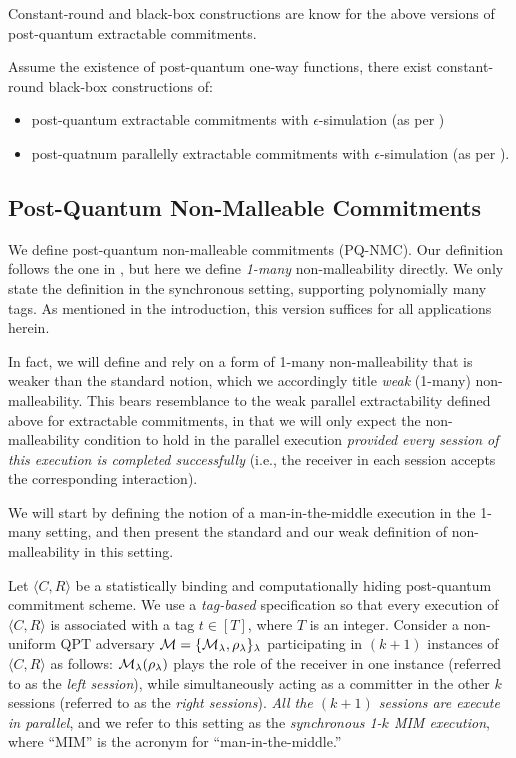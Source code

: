 Constant-round and black-box constructions are know for the above versions of post-quantum extractable commitments.
\begin{lemma}
\label{lem:parallel-extcom:CCLY}
Assume the existence of post-quantum one-way functions, there exist constant-round black-box constructions of:
\begin{itemize}
\item
post-quantum extractable commitments with $\epsilon$-simulation (as per )
\item
post-quatnum parallelly extractable commitments with $\epsilon$-simulation (as per ).
\end{itemize}
\end{lemma}


\subsection{Post-Quantum Non-Malleable Commitments}\label{sec:nmcom}



We define post-quantum non-malleable commitments (PQ-NMC). Our definition follows the one in \cite{FOCS:LPY23}, but here we define {\em 1-many} non-malleability directly. We only state the definition in the synchronous setting, supporting polynomially many tags. As mentioned in the introduction, this version suffices for all applications herein. 

In fact, we will define and rely on a form of 1-many non-malleability that is weaker than the standard notion, which we accordingly title {\em weak} (1-many) non-malleability.  This bears resemblance to the weak parallel extractability defined above for extractable commitments, in that we will only expect the non-malleability condition to hold in the parallel execution {\em provided every session of this execution is completed successfully} (i.e., the receiver in each session accepts the corresponding interaction).

We will start by defining the notion of a man-in-the-middle execution in the 1-many setting, and then present the standard and our weak definition of non-malleability in this setting. 


 Let $\langle C, R\rangle$ be a statistically binding and computationally hiding post-quantum commitment scheme. We use a {\em tag-based} specification so that every execution of $\langle C, R\rangle$ is associated with a tag $t\in [T]$, where $T$ is an integer. Consider a non-uniform QPT adversary $\mathcal{M} = \{\mathcal{M}_\lambda, \rho_\lambda\}_\lambda$ participating in $(k+1)$ instances of $\langle C, R\rangle$ as follows: $\mathcal{M}_\lambda(\rho_\lambda)$ plays the role of the receiver in one instance (referred to as the {\em left session}), while simultaneously acting as a committer in the other $k$ sessions (referred to as the {\em right sessions}). {\em All the $(k+1)$ sessions are execute in parallel}, and we refer to this setting as the {\em synchronous 1-$k$ MIM execution}, where ``MIM'' is the acronym for ``man-in-the-middle.'' 


